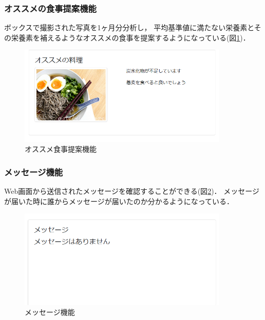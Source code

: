\documentclass[../report]{subfiles}
\begin{document}
\subsubsection{オススメの食事提案機能}
ボックスで撮影された写真を1ヶ月分分析し， 平均基準値に満たない栄養素とその栄養素を補えるようなオススメの食事を提案するようになっている(図\ref{fig:5_tv-suggestion})．

\begin{figure}[htbp]
    \begin{center}
        \includegraphics[width=10cm]{imgs/5_tv2.png}
        \caption{オススメ食事提案機能}
        \label{fig:5_tv-suggestion}
    \end{center}
\end{figure}

\subsubsection{メッセージ機能}
Web画面から送信されたメッセージを確認することができる(図\ref{fig:5_tv-message})．
メッセージが届いた時に誰からメッセージが届いたのか分かるようになっている．

\begin{figure}[htbp]
    \begin{center}
        \includegraphics[width=10cm]{imgs/5_tv3.png}
        \caption{メッセージ機能}
        \label{fig:5_tv-message}
    \end{center}
\end{figure}
\end{document}
